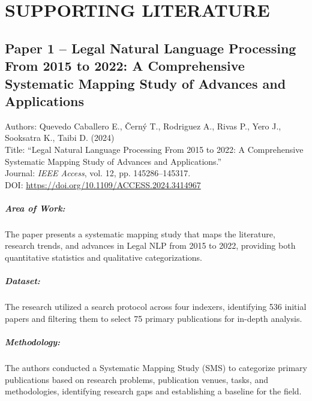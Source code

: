 \documentclass[12pt, a4paper]{report}
\begin{document}
\newpage

\chapter{SUPPORTING LITERATURE}
\label{ch:supporting_literature}

\section{Paper 1 -- Legal Natural Language Processing From 2015 to 2022: A Comprehensive Systematic Mapping Study of Advances and Applications}
\label{sec:paper1}

Authors: Quevedo Caballero E., Černý T., Rodriguez A., Rivas P., Yero J., Sooksatra K., Taibi D. (2024)\\
Title: ``Legal Natural Language Processing From 2015 to 2022: A Comprehensive Systematic Mapping Study of Advances and Applications.''\\
Journal: \textit{IEEE Access}, vol. 12, pp. 145286--145317.\\
DOI: \url{https://doi.org/10.1109/ACCESS.2024.3414967}

\paragraph{Area of Work:}
The paper presents a systematic mapping study that maps the literature, research trends, and advances in Legal NLP from 2015 to 2022, providing both quantitative statistics and qualitative categorizations.

\paragraph{Dataset:}
The research utilized a search protocol across four indexers, identifying 536 initial papers and filtering them to select 75 primary publications for in-depth analysis.

\paragraph{Methodology:}
The authors conducted a Systematic Mapping Study (SMS) to categorize primary publications based on research problems, publication venues, tasks, and methodologies, identifying research gaps and establishing a baseline for the field.
\end{document}
